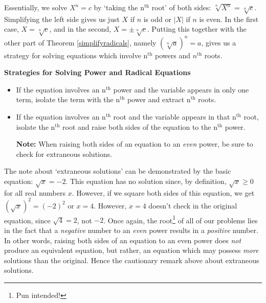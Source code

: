 \documentclass{ximera}
\begin{document}

 

Essentially, we solve $X^{n} = c$ by `taking the $\text{n}^{\text{th}}$ root' of both sides:  $\sqrt[n]{X^{n}} = \sqrt[n]{c}$. Simplifying the left side gives us just $X$ if $n$ is odd or $|X|$ if $n$ is even.  In the first case,  $X =  \sqrt[n]{c}$, and in the second, $X = \pm \sqrt[n]{c}$.  Putting this together with the other part of Theorem \ref{simplifyradicals}, namely $(\sqrt[n]{a})^n = a$, gives us a strategy for solving equations which involve $\text{n}^{\text{th}}$ powers and $n^{\text{th}}$ roots. 

\label{solvepowerandradicaleqns}

 

\centerline{\textbf{Strategies for Solving Power and Radical Equations}}

\begin{itemize}

\item  If the equation involves an $\text{n}^{\text{th}}$ power and the variable appears in only one term, isolate the term with the $\text{n}^{\text{th}}$ power and extract $\text{n}^{\text{th}}$ roots.

\item  If the equation involves an $\text{n}^{\text{th}}$ root and the variable appears in that $\text{n}^{\text{th}}$ root, isolate the $\text{n}^{\text{th}}$ root and raise both sides of the equation to the $\text{n}^{\text{th}}$ power.

\textbf{Note:}  When raising both sides of an equation to an \textit{even} power, be sure to check for extraneous solutions.

\end{itemize}


 

The note about `extraneous solutions' can be demonstrated by the basic equation: $\sqrt{x} = -2$.  This equation has no solution since, by definition, $\sqrt{x} \geq 0$ for all real numbers $x$.  However, if we square both sides of this equation, we get $(\sqrt{x})^2 = (-2)^2$ or $x = 4$.  However, $x = 4$ doesn't check in the original equation, since $\sqrt{4} = 2$, not $-2$.  Once again, the root\footnote{Pun intended!} of all of our problems lies in the fact that a \textit{negative} number to an \textit{even} power results in a \textit{positive} number. In other words, raising both sides of an equation to an even power does \textit{not} produce an equivalent equation, but rather, an equation which may possess \textit{more} solutions than the original.  Hence the cautionary remark above about extraneous solutions.
\end{document}

